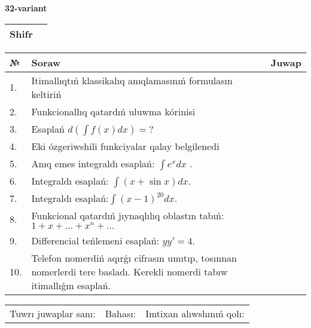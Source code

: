 \documentclass{article}
\begin{document}
  \egroup
  
  \newpage
  
  
  \textbf{32-variant}\\
  
  \bgroup
  \def\arraystretch{1.6} %
  
  \begin{tabular}{|m{5.7cm}|m{9.5cm}|}
  \hline
  Shifr & \\
  \hline
  \end{tabular}
  
  \vspace{1cm}
  
  \begin{tabular}{|m{0.7cm}|m{10cm}|m{4cm}|}
  \hline
  № & Soraw & Juwap \\
  \hline
  1. & Itimallıqtıń klassikalıq anıqlamasınıń formulasın keltiriń &  \\
  \hline
  2. & Funkcionallıq qatardıń uluwma kórinisi &  \\
  \hline
  3. & Esaplań \(d\left( \int{f(x)dx} \right) = ?\) &  \\
  \hline
  4. & Eki ózgeriwshili funkciyalar qalay belgilenedi &  \\
  \hline
  5. & Anıq emes integraldı esaplań: \(\int{e^{x}dx}\) . &  \\
  \hline
  6. & Integraldı esaplań: \(\int{(x + \sin x)dx}\). &  \\
  \hline
  7. & Integraldı esaplań:\(\int{(x - 1)^{20}}dx\). &  \\
  \hline
  8. & Funkcional qatardıń jıynaqlılıq oblastın tabıń:\(1 + x + ... + x^{n} + ...\) &  \\
  \hline
  9. & Differencial teńlemeni esaplań: \(yy' = 4\). &  \\
  \hline
  10. & Telefon nomerdiń aqırǵı cifrasın umıtıp, tosınnan nomerlerdi tere basladı. Kerekli nomerdi tabıw itimallıǵın esaplań. &  \\
  \hline
  \end{tabular}
  
  \vspace{1cm}
  
  \begin{tabular}{lll}
  Tuwrı juwaplar sanı: \underline{\hspace{1.5cm}} & 
  Bahası: \underline{\hspace{1.5cm}} & 
  Imtixan alıwshınıń qolı: \underline{\hspace{2cm}} \\
  \end{tabular}
  
\end{document}
